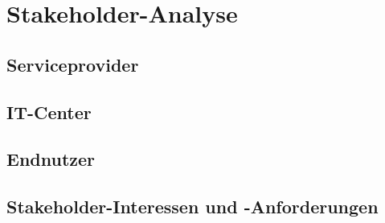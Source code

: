 \section{Stakeholder-Analyse}\label{sec:stakeholder}
   \subsection{Serviceprovider}\label{subsec:serviceprovider}
   \subsection{IT-Center}\label{subsec:itcenter}
   \subsection{Endnutzer}\label{subsec:endnutzer}
   \subsection{Stakeholder-Interessen und -Anforderungen}\label{subsec:stakeholder-anforderungen}